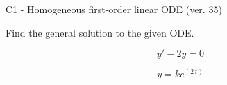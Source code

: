 \begin{exercise}
  \begin{exerciseTitle}C1 - Homogeneous first-order linear ODE (ver. 35)\end{exerciseTitle}
  \begin{exerciseStatement}
    
Find the general solution to the given ODE.

    
\[y'-2y=0\]

  \end{exerciseStatement}
  \begin{exerciseAnswer}
    
\[y= k e^{\left(2 \, t\right)}\]

  \end{exerciseAnswer}
\end{exercise}